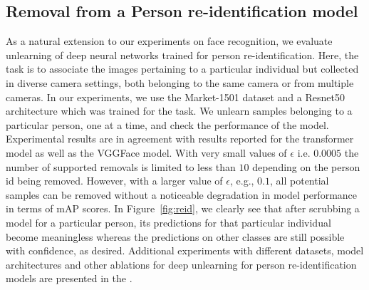 \subsection{Removal from a Person re-identification model}
As a natural extension to our experiments on face recognition, we evaluate unlearning of deep neural networks trained for person re-identification. Here, the task is to associate the images pertaining to a particular individual but collected in diverse camera settings, both belonging to the same camera or from multiple cameras. In our experiments, we use the Market-1501 dataset \citep{zheng2015scalable} and a Resnet50 architecture which was trained for the task. We unlearn samples belonging to a particular person, one at a time, and check the performance of the model. Experimental results are in agreement with results reported for the transformer model as well as the VGGFace model. With very small values of $\epsilon$ i.e. $0.0005$ the number of supported removals is limited to less than $10$ depending on the person id being removed. However, with a larger value of $\epsilon$, e.g., $0.1$, all potential samples can be removed without a noticeable degradation in model performance in terms of mAP scores. In Figure~\ref{fig:reid}, we clearly see that after scrubbing a model for a particular person, its predictions for that particular individual become meaningless whereas the predictions on other classes are still possible with confidence, as desired. Additional experiments with different datasets, model architectures and other ablations for deep unlearning for person re-identification models are presented in the .

